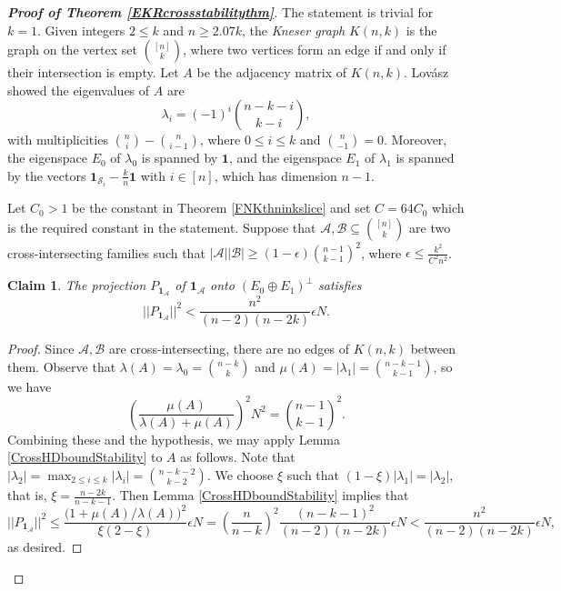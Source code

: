\documentclass[10pt,a4paper]{amsart}
\numberwithin{equation}{section}
\newtheorem{claim}[theorem]{Claim}
\def\A{\mathcal{A}}
\def\B{\mathcal{B}}
\def\S{\mathcal{S}}
\def\1{\mathbf{1}}
\begin{document}
\begin{proof}[{\bf Proof of Theorem \ref{EKRcrossstabilitythm}}]
The statement is trivial for $k=1$.
Given integers $2\leq  k$ and $n\geq 2.07k$,
the {\em Kneser graph} $K(n, k)$ is the graph
on the vertex set $\binom{[n]}{k}$,
where two vertices %
form an edge if and only if their intersection is empty.
Let $A$ be the adjacency matrix of $K(n,k)$.
Lov\'asz \cite{Lovasz} showed the eigenvalues of $A$ are
$$\lambda_i=(-1)^i \binom{n-k-i}{k-i},$$
with multiplicities $\binom{n}{i}-\binom{n}{i-1}$,
where $0\leq i \leq k$ and $\binom{n}{ -1}=0$.
Moreover, the eigenspace $E_0$ of $\lambda_0$ is spanned by $\1$,
and the eigenspace $E_1$ of $\lambda_1$ is spanned by the vectors
$\1_{\S_i}-\frac{k}{n}\1$ with $i\in [n]$, which has dimension $n-1$.



Let $C_0>1$ be the constant in Theorem \ref{FNKthninkslice}
and set $C=64C_0$ which is the required constant in the statement.
Suppose that $\A,\B\subseteq \binom{[n]}{k}$ are two cross-intersecting families such that $|\A||\B|\geq (1-\epsilon)\binom{n-1}{k-1}^2$,
where $\epsilon\leq \frac{k^2}{C^2n^2}$.



\begin{claim}\label{claimprojectionsmall}
The projection $P_{\1_\A}$ of $\1_\A$ onto $(E_0\oplus E_1)^{\bot}$
satisfies
$$||P_{\1_\A}||^2 < \frac{n^2}{ (n-2 )(n-2k )}\epsilon N.$$
\end{claim}
\begin{proof}
Since $\A,\B$ are cross-intersecting,
there are no edges of $K(n, k)$ between them.
Observe that $\lambda(A)=\lambda_0=\binom{n-k }{k}$ and
$\mu(A)=|\lambda_1|= \binom{n-k-1}{k-1}$,
so we have
$$ \left(\frac{\mu (A)}{\lambda (A)+\mu (A)}\right)^2N^2=\binom{n-1}{k-1}^2.$$
Combining these and the hypothesis,
we may apply Lemma \ref{CrossHDboundStability} to $A$ as follows.
Note that
$|\lambda_2|=\max_{2\leq i\leq k} |\lambda_i|=\binom{n-k-2}{k-2}$.
We choose $\xi$ such that $(1-\xi)|\lambda_1|= |\lambda_2|,$ that is, $\xi=\frac{ n-2k }{n-k-1}$.
Then Lemma \ref{CrossHDboundStability} implies that
$$||P_{\1_\A}||^2 \leq \frac{\big(1 +  \mu(A)/ \lambda(A) \big)^2 }
{ \xi(2-\xi) } \epsilon N
=\left(\frac{n}{n-k}\right)^2 \frac{(n-k-1)^2}{(n-2)(n-2k)} \epsilon N
< \frac{n^2}{ (n-2 )(n-2k )}\epsilon N,$$
as desired.
\end{proof}






\end{proof}
\end{document}
